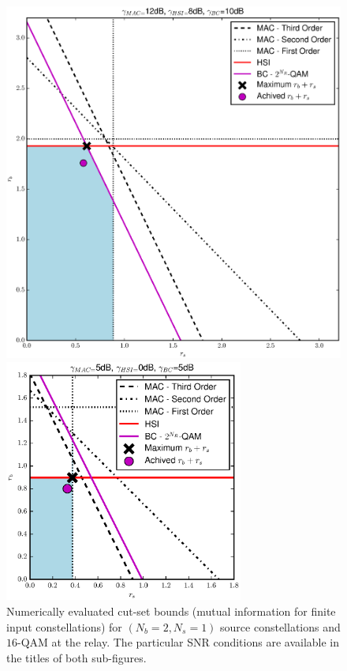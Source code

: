 \documentclass{article}
\begin{document}
\begin{figure}
\begin{centering}
\includegraphics[width=0.7\columnwidth]{fig/Rate_Regions_XOR_map_BC10_MAC12_HSI8}
\par\end{centering}

\begin{centering}
\includegraphics[width=0.7\textwidth]{fig/Rate_Regions_XOR_map_BC5_MAC5_HSI0}
\par\end{centering}

\caption{Numerically evaluated cut-set bounds (mutual information for finite
input constellations) for $(N_{b}=2,N_{s}=1)$ source constellations
and $16$-QAM at the relay. The particular SNR conditions are available
in the titles of both sub-figures.\label{fig:CTUpp_CSB_eval}}
\end{figure}
\end{document}
